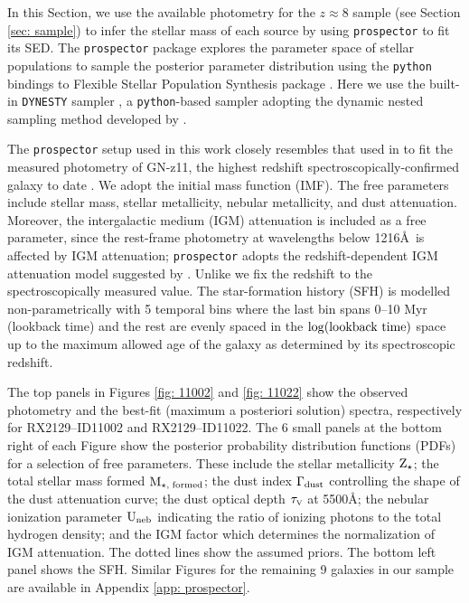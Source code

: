 \documentclass[twocolumn]{aastex631}
\begin{document}
In this Section, we use the available photometry for the $z \approx 8$ sample (see Section \ref{sec: sample}) to infer the stellar mass of each source by using \texttt{prospector} \citep{prospector} to fit its SED. The \texttt{prospector} package explores the parameter space of stellar populations to sample the posterior parameter distribution using the \texttt{python} bindings \citep{2014zndo.....12157F} to Flexible Stellar Population Synthesis package \citep[\texttt{FSPS;}][]{FSPS1, FSPS2}. Here we use the built-in \texttt{DYNESTY} sampler \citep{dynesty}, a \texttt{python}-based sampler adopting the dynamic nested sampling method developed by \cite{2019S&C....29..891H}. 

The \texttt{prospector} setup used in this work closely resembles that used in \cite{prospector} to fit the measured photometry of GN-z11, the highest redshift spectroscopically-confirmed galaxy to date \citep{gnz11}. We adopt the \cite{chabrier+2003} initial mass function (IMF). The free parameters include stellar mass, stellar metallicity, nebular metallicity, and dust attenuation. Moreover, the intergalactic medium (IGM) attenuation is included as a free parameter, since the rest-frame photometry at wavelengths below 1216\AA\ is affected by IGM attenuation; \texttt{prospector} adopts the redshift-dependent IGM attenuation model suggested by \cite{1995ApJ...441...18M}. Unlike \cite{prospector} we fix the redshift to the spectroscopically measured value. The star-formation history (SFH) is modelled non-parametrically with 5 temporal bins where the last bin spans 0--10 Myr (lookback time) and the rest are evenly spaced in the $\log(\textnormal{lookback time})$ space up to the maximum allowed age of the galaxy as determined by its spectroscopic redshift.

The top panels in Figures \ref{fig: 11002} and \ref{fig: 11022} show the observed photometry and the best-fit (maximum a posteriori solution) spectra, respectively for RX2129--ID11002 and RX2129--ID11022. The 6 small panels at the bottom right of each Figure show the posterior probability distribution functions (PDFs) for a selection of free parameters. These include the stellar metallicity $\textnormal{Z}_{\star}$; the total stellar mass formed $\textnormal{M}_{\star,\;\textnormal{{\scriptsize formed}}}$; the dust index $\Gamma_{\textnormal{\scriptsize dust}}$ controlling the shape of the dust attenuation curve; the dust optical depth $\tau_{\textnormal{\tiny V}}$ at 5500\AA; the nebular ionization parameter $\textnormal{U}_{\textnormal{\scriptsize neb}}$ indicating the ratio of ionizing photons to the total hydrogen density; and the IGM factor which determines the normalization of \cite{1995ApJ...441...18M} IGM attenuation. The dotted lines show the assumed priors. The bottom left panel shows the SFH. Similar Figures for the remaining 9 galaxies in our sample are available in Appendix \ref{app: prospector}. 
\end{document}
